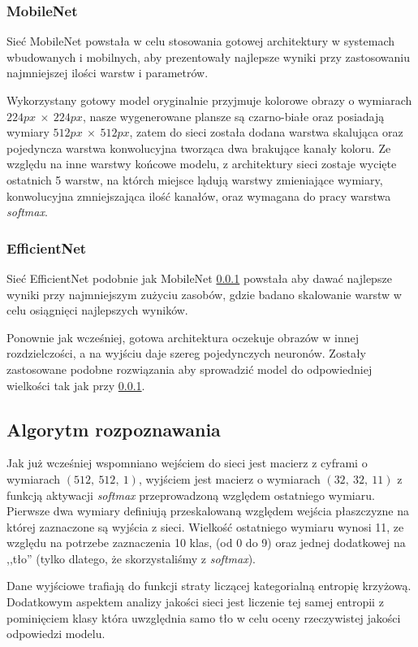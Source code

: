 \documentclass[10pt]{article}
\begin{document}
\subsubsection{MobileNet} \label{subsec:mobile}
Sieć MobileNet powstała w celu stosowania gotowej architektury w systemach wbudowanych i mobilnych, aby prezentowały najlepsze wyniki przy zastosowaniu najmniejszej ilości warstw i parametrów.

Wykorzystany gotowy model oryginalnie przyjmuje kolorowe obrazy o wymiarach $224px\ \times\ 224px$, nasze wygenerowane plansze są czarno-białe oraz posiadają wymiary $512px\ \times\ 512px$, zatem do sieci została dodana warstwa skalująca oraz pojedyncza warstwa konwolucyjna tworząca dwa brakujące kanały koloru. Ze względu na inne warstwy końcowe modelu, z architektury sieci zostaje wycięte ostatnich 5 warstw, na którch miejsce lądują warstwy zmieniające wymiary, konwolucyjna zmniejszająca ilość kanałów, oraz wymagana do pracy warstwa \emph{softmax}.

\subsubsection{EfficientNet} \label{subsec:efficient}
Sieć EfficientNet podobnie jak MobileNet \ref{subsec:mobile} powstała aby dawać najlepsze wyniki przy najmniejszym zużyciu zasobów, gdzie badano skalowanie warstw w celu osiągnięci najlepszych wyników.

Ponownie jak wcześniej, gotowa architektura oczekuje obrazów w innej rozdzielczości, a na wyjściu daje szereg pojedynczych neuronów. Zostały zastosowane podobne rozwiązania aby sprowadzić model do odpowiedniej wielkości tak jak przy \ref{subsec:mobile}.


\subsection{Algorytm rozpoznawania}
Jak już wcześniej wspomniano wejściem do sieci jest macierz z cyframi o wymiarach $(512,\ 512,\ 1)$, wyjściem jest macierz o wymiarach $(32,\ 32,\ 11)$ z funkcją aktywacji \emph{softmax} przeprowadzoną względem ostatniego wymiaru.
Pierwsze dwa wymiary definiują przeskalowaną względem wejścia płaszczyzne na której zaznaczone są wyjścia z sieci. Wielkość ostatniego wymiaru wynosi 11, ze względu na potrzebe zaznaczenia 10 klas, (od 0 do 9) oraz jednej dodatkowej na ,,tło'' (tylko dlatego, że skorzystaliśmy z \emph{softmax}).

Dane wyjściowe trafiają do funkcji straty liczącej kategorialną entropię krzyżową. Dodatkowym aspektem analizy jakości sieci jest liczenie tej samej entropii z pominięciem klasy która uwzględnia samo tło w celu oceny rzeczywistej jakości odpowiedzi modelu.
\end{document}
